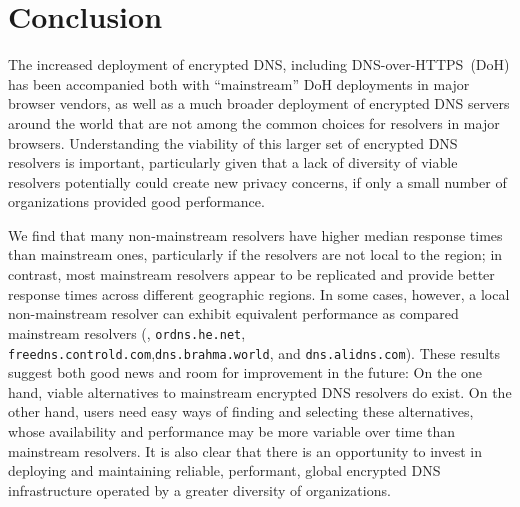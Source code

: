 \section{Conclusion}\label{sec:conclusion}

The increased deployment of encrypted DNS, including DNS-over-HTTPS~(DoH) has
been accompanied both with ``mainstream'' DoH deployments in major browser
vendors, as well as a much broader deployment of encrypted DNS servers around
the world that are not among the common choices for resolvers in major
browsers.  Understanding the viability of this larger set of encrypted DNS
resolvers is important, particularly given that a lack of diversity of viable
resolvers potentially could create new privacy concerns, if only a small
number of organizations provided good performance. 

We find that many non-mainstream resolvers have higher median response times
than mainstream ones, particularly if the resolvers are not local to the
region; in contrast, most mainstream resolvers appear to be replicated and
provide better response times across different geographic regions. In some
cases, however, a local non-mainstream resolver can exhibit equivalent
performance as compared mainstream resolvers (\eg, {\tt ordns.he.net}, {\tt
freedns.controld.com},{\tt dns.brahma.world}, and {\tt dns.alidns.com}). These
results suggest both good news and room for improvement in the future: On the
one hand, viable alternatives to mainstream encrypted DNS resolvers do exist.
On the other hand, users need easy ways of finding and selecting these
alternatives, whose availability and performance may be more variable over
time than mainstream resolvers. It is also clear that there is an opportunity
to invest in deploying and maintaining reliable, performant, global encrypted
DNS infrastructure operated by a greater diversity of organizations.

